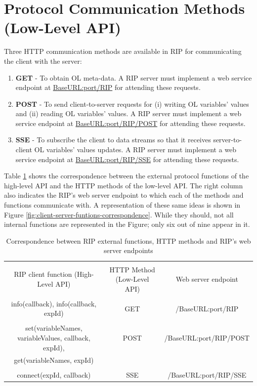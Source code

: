 \section{Protocol Communication Methods (Low-Level API)}
Three HTTP communication methods are available in RIP for communicating the client with the server:

\begin{enumerate}
    \item \textbf{GET} - To obtain OL meta-data. A RIP server must implement a web service endpoint at \url{BaseURL:port/RIP} for attending these requests.
    \item \textbf{POST} - To send client-to-server requests for (i) writing OL variables' values and (ii) reading OL variables' values. A RIP server must implement a web service endpoint at \url{BaseURL:port/RIP/POST} for attending these requests.
    \item \textbf{SSE} - To subscribe the client to data streams so that it receives server-to-client OL variables' values updates. A RIP server must implement a web service endpoint at \url{BaseURL:port/RIP/SSE} for attending these requests.
\end{enumerate}

Table \ref{tab:low-high-levels-correspondence} shows the correspondence between the external protocol functions of the high-level API and the HTTP methods of the low-level API. The right column also indicates the RIP's web server endpoint to which each of the methods and functions communicate with. A representation of these same ideas is shown in Figure \ref{fig:client-server-funtions-correspondence}. While they should, not all internal functions are represented in the Figure; only six out of nine appear in it.

\begin{table}[]
    \centering
    \begin{tabular}{c|c|c}
        \hline
        & \\RIP client function (High-Level API) & HTTP Method (Low-Level API) & Web server endpoint \\
        \hline
        & \\info(callback), info(callback, expId) & GET & /BaseURL:port/RIP \\
        \hline
        & \\set(variableNames, variableValues, callback, expId), & POST & /BaseURL:port/RIP/POST
          \\get(variableNames, expId) &  & \\
        \hline
        & \\connect(expId, callback) & SSE & /BaseURL:port/RIP/SSE \\
        \hline
    \end{tabular}
    \caption{Correspondence between RIP external functions, HTTP methods and RIP's web server endpoints}
    \label{tab:low-high-levels-correspondence}
\end{table}

